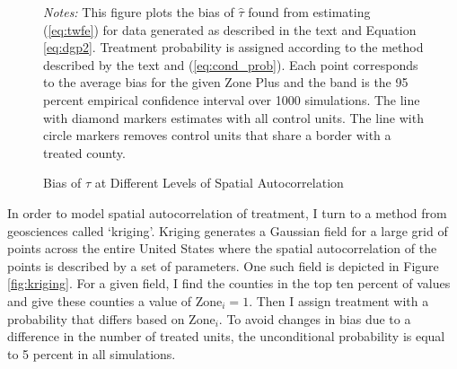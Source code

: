 \documentclass[11pt]{article}
\begin{document}
\begin{figure}[tbh!]
    \caption{Bias of $\hat{\tau}$ at Different Levels of Spatial Autocorrelation}
    \label{fig:bias_spatial_autocorr}
    {\centering
    }

    {\footnotesize
        \textit{Notes:} This figure plots the bias of $\hat{\tau}$ found from estimating (\ref{eq:twfe}) for data generated as described in the text and Equation \ref{eq:dgp2}. Treatment probability is assigned according to the method described by the text and (\ref{eq:cond_prob}). Each point corresponds to the average bias for the given Zone Plus and the band is the 95 percent empirical confidence interval over 1000 simulations. The line with diamond markers estimates with all control units. The line with circle markers removes control units that share a border with a treated county. 
    }
\end{figure}

In order to model spatial autocorrelation of treatment, I turn to a method from geosciences called `kriging'. Kriging generates a Gaussian field for a large grid of points across the entire United States where the spatial autocorrelation of the points is described by a set of parameters. One such field is depicted in Figure \ref{fig:kriging}. For a given field, I find the counties in the top ten percent of values and give these counties a value of $\text{Zone}_i = 1$. Then I assign treatment with a probability that differs based on $\text{Zone}_i$. To avoid changes in bias due to a difference in the number of treated units, the unconditional probability is equal to 5 percent in all simulations. 
\end{document}
